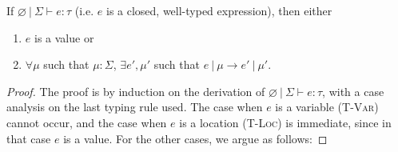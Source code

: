 \documentclass{llncs}
\begin{document}
\vspace{15pt}

\begin{theorem}[Progress]
If $\varnothing~|~\Sigma \vdash e : \tau$ (i.e. $e$ is a closed, well-typed expression), then either
\begin{enumerate}
\item $e$ is a value or
\item $\forall \mu$ such that $\mu : \Sigma$,
   $\exists e', \mu'$ such that $e~|~\mu \longrightarrow e'~|~\mu'$.
\end{enumerate}
\end{theorem}
\begin{proof} The proof is by induction on the derivation of $\varnothing~|~\Sigma \vdash e : \tau$, with a case analysis on the last typing rule used. The case when $e$ is a variable (\textsc{T-Var}) cannot occur, and the case when $e$ is a location (\textsc{T-Loc}) is immediate, since in that case $e$ is a value. For the other cases, we argue as follows:


\end{proof}
\end{document}
